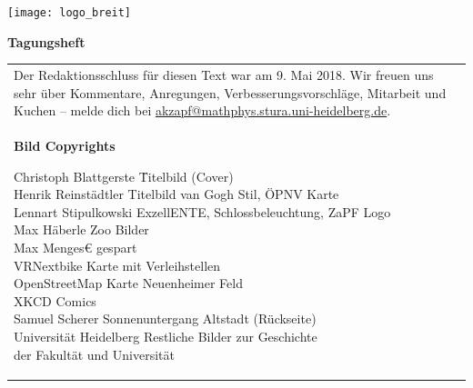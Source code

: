 \documentclass[a5paper]{scrbook}
\begin{document}
\pagestyle{empty}
\centering
\texttt{[image: logo\_breit]} 

\vspace*{14cm} \centering \fontsize{40}{48} \textbf{Tagungsheft}
\normalsize

      
\null
\newpage
{}
\vspace*{\fill}
    \begin{tabular*}{\textwidth}{ll}
        \multicolumn{2}{l}{
            \parbox{\textwidth}{
                Der Redaktionsschluss für diesen Text war am 9. Mai 2018. Wir freuen uns
                sehr über Kommentare, Anregungen, Verbesserungsvorschläge,
                Mitarbeit und Kuchen -- melde dich bei
                \href{mailto:akzapf@mathphys.stura.uni-heidelberg.de}{akzapf@mathphys.stura.uni-heidelberg.de}.
            }
            \vspace{1cm}
        }\\
	\multicolumn{2}{l}{
	\parbox{0.77\textwidth}{
       	\textbf{Bild Copyrights}
       	\begin{tabbing}
		Christoph Blattgerste \quad \quad \=  Titelbild (Cover)\\		
		Henrik Reinstädtler\> Titelbild van Gogh Stil, ÖPNV Karte\\
		Lennart Stipulkowski \> ExzellENTE, Schlossbeleuchtung, ZaPF Logo\\
		Max Häberle \> Zoo Bilder\\
		Max Menges€ gespart \\		
		VRNextbike\footnotemark \> Karte mit Verleihstellen\\
		OpenStreetMap\footnotemark \> Karte Neuenheimer Feld\\
		XKCD\footnotemark \> Comics\\
		Samuel Scherer\footnotemark \> Sonnenuntergang Altstadt (Rückseite)\\
		Universität Heidelberg \> Restliche Bilder zur Geschichte\\
		\>der Fakultät und Universität\\
		


\end{tabbing}}}
\end{tabular*}
\end{document}
